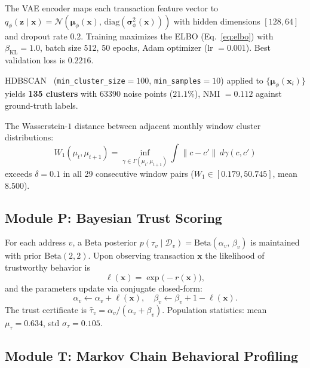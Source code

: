 \documentclass[journal]{IEEEtran}
\begin{document}
The VAE encoder maps each transaction feature vector to
$q_\phi(\mathbf{z} \mid \mathbf{x}) = \mathcal{N}(\boldsymbol{\mu}_\phi(\mathbf{x}),\,
\mathrm{diag}(\boldsymbol{\sigma}^2_\phi(\mathbf{x})))$ with
hidden dimensions $[128, 64]$ and dropout rate $0.2$.
Training maximizes the ELBO (Eq.~\ref{eq:elbo}) with $\beta_{\mathrm{KL}} = 1.0$,
batch size 512, 50 epochs, Adam optimizer (lr $= 0.001$).
Best validation loss is $0.2216$.

HDBSCAN~\cite{Campello2013} (\texttt{min\_cluster\_size}$= 100$,
\texttt{min\_samples}$= 10$) applied to $\{\boldsymbol{\mu}_\phi(\mathbf{x}_i)\}$
yields \textbf{135 clusters} with \num{63390} noise points ($21.1\%$),
NMI $= 0.112$ against ground-truth labels.

The Wasserstein-$1$ distance between adjacent monthly window cluster distributions:
\begin{equation}
  W_1(\mu_t, \mu_{t+1})
    = \inf_{\gamma \in \Gamma(\mu_t, \mu_{t+1})}
        \int \|c - c'\| \, d\gamma(c, c')
  \label{eq:w1}
\end{equation}
exceeds $\delta = 0.1$ in all 29 consecutive window pairs
($W_1 \in [0.179, 50.745]$, mean $8.500$).

\subsection{Module P: Bayesian Trust Scoring}
\label{sec:module_p}

For each address $v$, a Beta posterior
$p(\tau_v \mid \mathcal{D}_v) = \mathrm{Beta}\!\left(\alpha_v,\, \beta_v\right)$
is maintained with prior $\mathrm{Beta}(2, 2)$.
Upon observing transaction $\mathbf{x}$ the likelihood of trustworthy behavior is
\begin{equation}
  \ell(\mathbf{x}) = \exp\!\bigl(-r(\mathbf{x})\bigr),
  \label{eq:likelihood_p}
\end{equation}
and the parameters update via conjugate closed-form:
\begin{equation}
  \alpha_v \leftarrow \alpha_v + \ell(\mathbf{x}), \quad
  \beta_v  \leftarrow \beta_v  + 1 - \ell(\mathbf{x}).
  \label{eq:beta_update}
\end{equation}
The trust certificate is $\hat{\tau}_v = \alpha_v / (\alpha_v + \beta_v)$.
Population statistics: mean $\mu_\tau = 0.634$, std $\sigma_\tau = 0.105$.

\subsection{Module T: Markov Chain Behavioral Profiling}
\label{sec:module_t}
\end{document}
